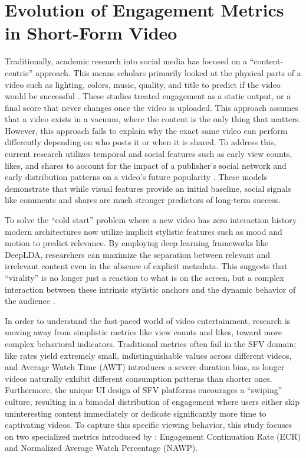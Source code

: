 \section{Evolution of Engagement Metrics in Short-Form Video}
Traditionally, academic research into social media has focused on a ``content-centric'' approach. This means scholars primarily looked at the physical parts of a video such as lighting, colors, music, quality, and title to predict if the video would be successful \cite{8549180}. These studies treated engagement as a static output, or a final score that never changes once the video is uploaded. This approach assumes that a video exists in a vacuum, where the content is the only thing that matters. However, this approach fails to explain why the exact same video can perform differently depending on who posts it or when it is shared. To address this, current research utilizes temporal and social features such as early view counts, likes, and shares to account for the impact of a publisher's social network and early distribution patterns on a video's future popularity \cite{trzcinski2017predicting}. These models demonstrate that while visual features provide an initial baseline, social signals like comments and shares are much stronger predictors of long-term success.

To solve the ``cold start'' problem where a new video has zero interaction history modern architectures now utilize implicit stylistic features such as mood and motion to predict relevance. By employing deep learning frameworks like DeepLDA, researchers can maximize the separation between relevant and irrelevant content even in the absence of explicit metadata. This suggests that ``virality'' is no longer just a reaction to what is on the screen, but a complex interaction between these intrinsic stylistic anchors and the dynamic behavior of the audience \cite{kumar2018icebreaker}.

In order to understand the fast-paced world of video entertainment, research is moving away from simplistic metrics like view counts and likes, toward more complex behavioral indicators. Traditional metrics often fail in the SFV domain; like rates yield extremely small, indistinguishable values across different videos, and Average Watch Time (AWT) introduces a severe duration bias, as longer videos naturally exhibit different consumption patterns than shorter ones. Furthermore, the unique UI design of SFV platforms encourages a ``swiping'' culture, resulting in a bimodal distribution of engagement where users either skip uninteresting content immediately or dedicate significantly more time to captivating videos. To capture this specific viewing behavior, this study focuses on two specialized metrics introduced by \citeauthor{li2024delving} \citeyear{li2024delving}: Engagement Continuation Rate (ECR) and Normalized Average Watch Percentage (NAWP).

